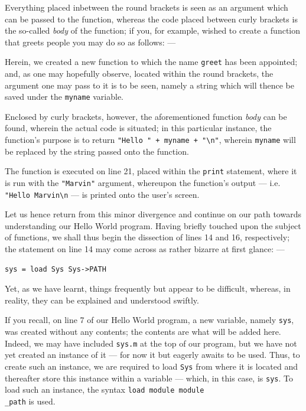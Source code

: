 \documentclass[a5paper,twoside,12pt]{report}
\begin{document}
Everything placed inbetween the round brackets is seen as an argument which can be passed to the function, whereas the code placed between curly brackets is the so-called \textit{body} of the function; if you, for example, wished to create a function that greets people you may do so as follows: —



Herein, we created a new function to which the name \texttt{greet} has been appointed; and, as one may hopefully observe, located within the round brackets, the argument one may pass to it is to be seen, namely a string which will thence be saved under the \texttt{myname} variable.

Enclosed by curly brackets, however, the aforementioned function \textit{body} can be found, wherein the actual code is situated; in this particular instance, the function's purpose is to return \texttt{"Hello " + myname + "\textbackslash n"}, wherein \texttt{myname} will be replaced by the string passed onto the function.

The function is executed on line 21, placed within the \texttt{print} statement, where it is run with the \texttt{"Marvin"} argument, whereupon the function's output — i.e. \texttt{"Hello Marvin\textbackslash n} — is printed onto the user's screen.

Let us hence return from this minor divergence and continue on our path towards understanding our Hello World program. Having briefly touched upon the subject of functions, we shall thus begin the dissection of lines 14 and 16, respectively; the statement on line 14 may come across as rather bizarre at first glance: —

\begin{lstlisting}
sys = load Sys Sys->PATH
\end{lstlisting}

Yet, as we have learnt, things frequently but appear to be difficult, whereas, in reality, they can be explained and understood swiftly. 

If you recall, on line 7 of our Hello World program, a new variable, namely \texttt{sys}, was created without any contents; the contents are what will be added here. Indeed, we may have included \texttt{sys.m} at the top of our program, but we have not yet created an instance of it — for now it but eagerly awaits to be used. Thus, to create such an instance, we are required to load \texttt{Sys} from where it is located and thereafter store this instance within a variable — which, in this case, is \texttt{sys}. To load such an instance, the syntax \texttt{load module module\\\_path} is used.
\end{document}
